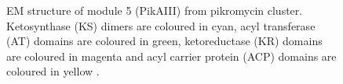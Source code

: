 			\setlength\fboxsep{5pt}
 			\setlength\fboxrule{1.5pt}
			\begin{figure} []
			\centering
			\caption[EM structure of module 5 (PikAIII) from pikromycin cluster]{EM structure of module 5 (PikAIII) from pikromycin cluster. Ketosynthase (KS) dimers are coloured in cyan, acyl transferase (AT) domains are coloured in green, ketoreductase (KR) domains are coloured in magenta and acyl carrier protein (ACP) domains are coloured in yellow \parencite{Dutta2014}.}
			\label{fig:emPksStructure}
			\end{figure}					
					
